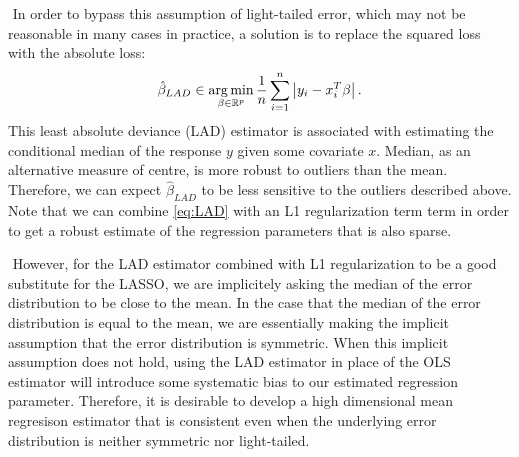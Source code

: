 $ $\newline
In order to bypass this assumption of light-tailed error, which may not be reasonable in many cases in practice, a solution is to replace the squared loss with the absolute loss:
\begin{align}
\hat{\beta}_{LAD} \in \argmin_{\beta\in\mathbb{R}^p} \frac{1}{n}\sum_{i=1}^n \left| y_i - x_i^T\beta \right|. \label{eq:LAD}
\end{align}
This least absolute deviance (LAD) estimator is associated with estimating the conditional median of the response $y$ given some covariate $x$. Median, as an alternative measure of centre, is more robust to outliers than the mean. Therefore, we can expect $\hat{\beta}_{LAD}$ to be less sensitive to the outliers described above. Note that we can combine \cref{eq:LAD} with an L1 regularization term term in order to get a robust estimate of the regression parameters that is also sparse.

$ $\newline
However, for the LAD estimator combined with L1 regularization to be a good substitute for the LASSO, we are implicitely asking the median of the error distribution to be close to the mean. In the case that the median of the error distribution is equal to the mean, we are essentially making the implicit assumption that the error distribution is symmetric. When this implicit assumption does not hold, using the LAD estimator in place of the OLS estimator will introduce some systematic bias to our estimated regression parameter. Therefore, it is desirable to develop a high dimensional mean regresison estimator that is consistent even when the underlying error distribution is neither symmetric nor light-tailed.